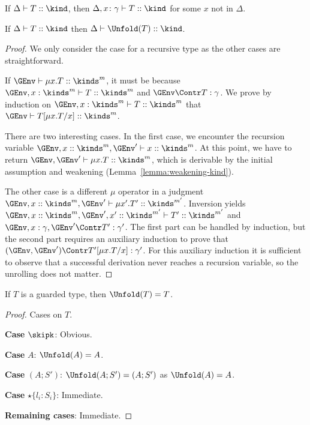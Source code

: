 \begin{lemma}[Weakening]\label{lemma:app:weakening-kind}
  If $\Delta \vdash T :: \kind$, then
  $\Delta, x\colon \gamma \vdash T :: \kind$ for some $x$ not in
  $\Delta$.
\end{lemma}


\begin{lemma}
  If $\Delta \vdash T :: \kind$ then $\Delta \vdash \Unfold(T) :: \kind$.
\end{lemma}
%
\begin{proof}
  We only consider the case for a recursive type as the other cases
  are straightforward.
  
  If  $\GEnv \vdash \mu x.T :: \kinds^m$, it must be because  $\GEnv,
  x:\kinds^m \vdash T :: \kinds^m$ and $\GEnv \Contr T : \gamma$.
  We prove by induction on $\GEnv, x:\kinds^m \vdash T :: \kinds^m$ that
  $\GEnv \vdash T[\mu  x. T/x] :: \kinds^m$.

  There are two interesting cases. In the first case, we encounter the
  recursion variable $\GEnv, x::\kinds^m, \GEnv' \vdash x
  :: \kinds^m$. At this point, we have to return $\GEnv, \GEnv' \vdash \mu
  x.T :: \kinds^m$, which is derivable by the initial assumption and
  weakening (Lemma~\ref{lemma:weakening-kind}).

  The other case is a different $\mu$ operator in a judgment $\GEnv,
  x::\kinds^m, \GEnv' \vdash \mu x'. T' :: \kinds^{m'}$. Inversion yields $\GEnv,
  x::\kinds^m, \GEnv', x'::\kinds^{m'} \vdash T'  :: \kinds^{m'}$ and $\GEnv,
  x:\gamma, \GEnv' \Contr T' : \gamma'$. The first part
  can be handled by induction, but the second part requires an
  auxiliary induction to prove that $(\GEnv, \GEnv')
  \Contr T'[\mu x.T/x] : \gamma'$. For this auxiliary induction it is
  sufficient to observe that a successful derivation never reaches a
  recursion variable, so the unrolling does not matter. 
\end{proof}

\begin{lemma}
  \label{lemma:app:unfold-fixpoints}
  If $T$ is a guarded type, then $\Unfold (T) = T$.
\end{lemma}
\begin{proof}
  Cases on $T$.

  \textbf{Case }$\skipk$: Obvious.

  \textbf{Case }$A$: $\Unfold (A) = A$.

  \textbf{Case }$(A; S')$:
  $\Unfold (A;S') = (A; S')$ as $\Unfold (A) = A$.

  \textbf{Case }$\star\{l_i\colon S_i\}$: Immediate.

  \textbf{Remaining cases}: Immediate.
\end{proof}

